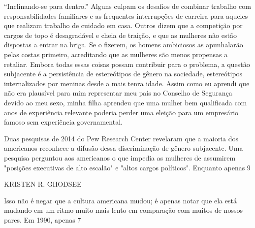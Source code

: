 “Inclinando-se para dentro.” Alguns culpam os desafios de combinar trabalho com responsabilidades familiares e as frequentes interrupções de carreira para aqueles que realizam trabalho de cuidado em casa. Outros dizem que a competição por cargos de topo é desagradável e cheia de traição, e que as mulheres não estão dispostas a entrar na briga. Se o fizerem, os homens ambiciosos as apunhalarão pelas costas primeiro, acreditando que as mulheres são menos propensas a retaliar. Embora todas essas coisas possam contribuir para o problema, a questão subjacente é a persistência de estereótipos de gênero na sociedade, estereótipos internalizados por meninas desde a mais tenra idade. Assim como eu aprendi que não era plausível para mim representar meu país no Conselho de Segurança devido ao meu sexo, minha filha aprendeu que uma mulher bem qualificada com anos de experiência relevante poderia perder uma eleição para um empresário famoso sem experiência governamental.
 \par 
Duas pesquisas de 2014 do Pew Research Center revelaram que a maioria dos americanos reconhece a difusão dessa discriminação de gênero subjacente. Uma pesquisa perguntou aos americanos o que impedia as mulheres de assumirem "posições executivas de alto escalão" e "altos cargos políticos". Enquanto apenas 9%
 \par 
KRISTEN R. GHODSEE
 \par 
Isso não é negar que a cultura americana mudou; é apenas notar que ela está mudando em um ritmo muito mais lento em comparação com muitos de nossos pares. Em 1990, apenas 7%
